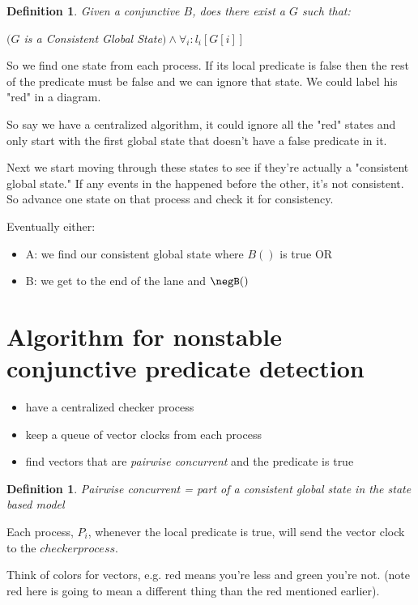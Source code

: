 \documentclass[twoside]{article}
\newtheorem{definition}[theorem]{Definition}
\begin{document}
\begin{definition}
Given a conjunctive $B$, does there exist a $G$ such that:

$(G$ is a \textit{Consistent Global State}$) \land \forall_i : l_i [G[i]]$
\end{definition}

So we find one state from each process. If its local predicate is false then the rest of the predicate must be false and we can ignore that state. We could label his "red" in a diagram.

So say we have a centralized algorithm, it could ignore all the "red" states and only start with the first global state that doesn't have a false predicate in it.

Next we start moving through these states to see if they're actually a "consistent global state." If any events in the happened before the other, it's not consistent. So advance one state on that process and check it for consistency.

Eventually either:
\begin{itemize}
    \item A: we find our consistent global state where $B()$ is true OR
    \item B: we get to the end of the lane and $\negB()$
\end{itemize}

\section{Algorithm for nonstable conjunctive predicate detection}

\begin{itemize}
    \item have a centralized checker process
    \item keep a queue of vector clocks from each process
    \item find vectors that are \textit{pairwise concurrent} and the predicate is true
\end{itemize}

\begin{definition}
Pairwise concurrent = part of a consistent global state in the state based model
\end{definition}

Each process, $P_i$, whenever the local predicate is true, will send the vector clock to the $checker process$.

Think of colors for vectors, e.g. red means you're less and green you're not. (note red here is going to mean a different thing than the red mentioned earlier).
\end{document}

